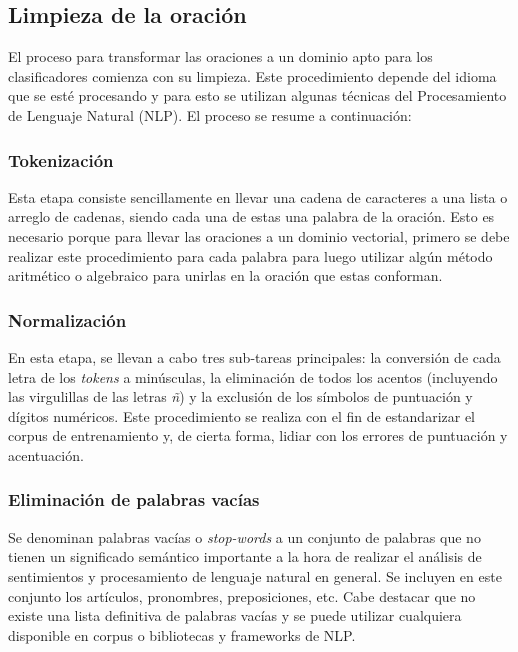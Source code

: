 \documentclass[conference]{IEEEtran}
\begin{document}
    
    \subsection{Limpieza de la oración}
    
    	El proceso para transformar las oraciones a un dominio apto para los clasificadores comienza con su limpieza. Este procedimiento depende del idioma que se esté procesando y para esto se utilizan algunas técnicas del Procesamiento de Lenguaje Natural (NLP). El proceso se resume a continuación:
    	\newline
    	
    	\subsubsection{Tokenización}
    	
    		Esta etapa consiste sencillamente en llevar una cadena de caracteres a una lista o arreglo de cadenas, siendo cada una de estas una palabra de la oración. Esto es necesario porque para llevar las oraciones a un dominio vectorial, primero se debe realizar este procedimiento para cada palabra para luego utilizar algún método aritmético o algebraico para unirlas en la oración que estas conforman.
    		\newline
    	
    	\subsubsection{Normalización}
    	
    		En esta etapa, se llevan a cabo tres sub-tareas principales: la conversión de cada letra de los \textit{tokens} a minúsculas, la eliminación de todos los acentos (incluyendo las virgulillas de las letras \textit{ñ}) y la exclusión de los símbolos de puntuación y dígitos numéricos. Este procedimiento se realiza con el fin de estandarizar el corpus de entrenamiento y, de cierta forma, lidiar con los errores de puntuación y acentuación.
    		\newline	
    	
    	\subsubsection{Eliminación de palabras vacías}
    	
    		Se denominan palabras vacías o \textit{stop-words} a un conjunto de palabras que no tienen un significado semántico importante a la hora de realizar el análisis de sentimientos y procesamiento de lenguaje natural en general. Se incluyen en este conjunto los artículos, pronombres, preposiciones, etc. Cabe destacar que no existe una lista definitiva de palabras vacías y se puede utilizar cualquiera disponible en corpus o bibliotecas y frameworks de NLP.
    		\newline
    	
\end{document}
